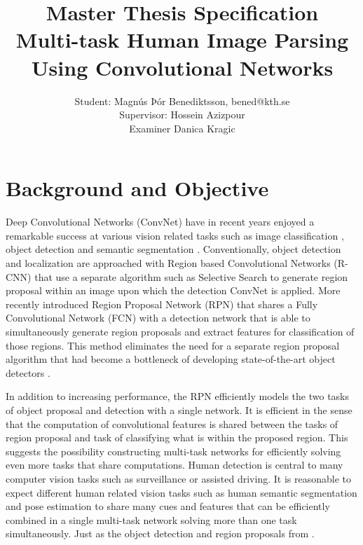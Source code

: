 \documentclass[a4paper,10pt]{article}
\title{Master Thesis Specification \\ Multi-task Human Image Parsing Using Convolutional Networks}
\author{Student: Magnús Þór Benediktsson, bened@kth.se \\ Supervisor: Hossein Azizpour \\ Examiner Danica Kragic}
\begin{document}
\maketitle



\section{Background and Objective}

Deep Convolutional Networks (ConvNet) have in recent years enjoyed a remarkable success at various vision related tasks such as image classification \cite{He2015,Szegedy2014,Krizhevsky2012}, object detection \cite{Ren2015} and semantic segmentation \cite{Long2014,Noh2015}.  Conventionally, object detection and localization are approached with Region based Convolutional Networks (R-CNN) \cite{Girshick2014} that use a separate algorithm such as Selective Search \cite{Uijlings2013} to generate region proposal within an image upon which the detection ConvNet is applied.  More recently \cite{Ren2015} introduced Region Proposal Network (RPN) that shares a Fully Convolutional Network (FCN) \cite{Long2014} with a detection network that is able to simultaneously generate region proposals and extract features for classification of those regions.  This method eliminates the need for a separate region proposal algorithm that had become a bottleneck of developing state-of-the-art object detectors \cite{Ren2015}.  

In addition to increasing performance, the RPN efficiently models the two tasks of object proposal and detection with a single network.  It is efficient in the sense that the computation of convolutional features is shared between the tasks of region proposal and task of classifying what is within the proposed region.  This suggests the possibility constructing multi-task networks for efficiently solving even more tasks that share computations.  Human detection is central to many computer vision tasks such as surveillance or assisted driving. It is reasonable to expect different human related vision tasks such as human semantic segmentation \cite{Long2014,Noh2015} and pose estimation \cite{Tompson2015,Wei2016} to share many cues and features that can be efficiently combined in a single multi-task network solving more than one task simultaneously.  Just as the object detection and region proposals from \cite{Ren2015}.
\end{document}
